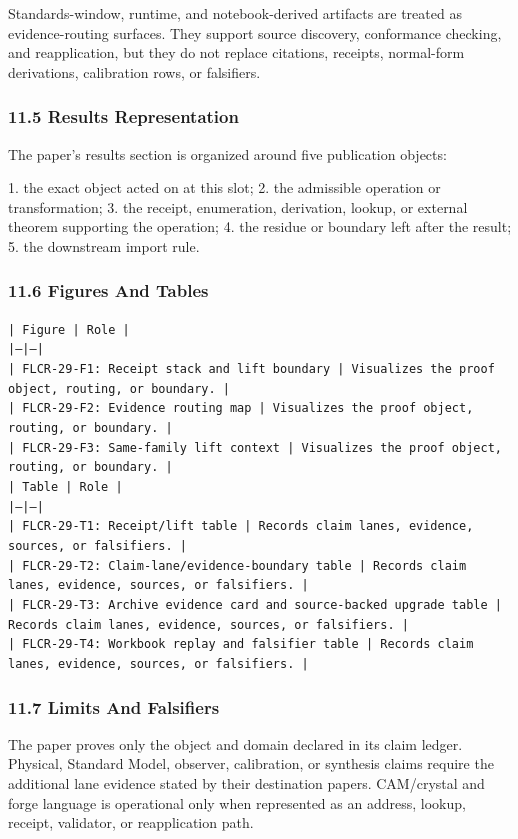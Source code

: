 \documentclass[11pt]{article}
\begin{document}
Standards-window, runtime, and notebook-derived artifacts are treated
as evidence-routing surfaces. They support source discovery, conformance
checking, and reapplication, but they do not replace citations, receipts,
normal-form derivations, calibration rows, or falsifiers.

\subsubsection*{11.5 Results Representation}

The paper's results section is organized around five publication objects:

1. the exact object acted on at this slot;
2. the admissible operation or transformation;
3. the receipt, enumeration, derivation, lookup, or external theorem supporting
   the operation;
4. the residue or boundary left after the result;
5. the downstream import rule.

\subsubsection*{11.6 Figures And Tables}

\noindent\texttt{| Figure | Role |}\\
\noindent\texttt{|---|---|}\\
\noindent\texttt{| FLCR-29-F1: Receipt stack and lift boundary | Visualizes the proof object, routing, or boundary. |}\\
\noindent\texttt{| FLCR-29-F2: Evidence routing map | Visualizes the proof object, routing, or boundary. |}\\
\noindent\texttt{| FLCR-29-F3: Same-family lift context | Visualizes the proof object, routing, or boundary. |}\\

\noindent\texttt{| Table | Role |}\\
\noindent\texttt{|---|---|}\\
\noindent\texttt{| FLCR-29-T1: Receipt/lift table | Records claim lanes, evidence, sources, or falsifiers. |}\\
\noindent\texttt{| FLCR-29-T2: Claim-lane/evidence-boundary table | Records claim lanes, evidence, sources, or falsifiers. |}\\
\noindent\texttt{| FLCR-29-T3: Archive evidence card and source-backed upgrade table | Records claim lanes, evidence, sources, or falsifiers. |}\\
\noindent\texttt{| FLCR-29-T4: Workbook replay and falsifier table | Records claim lanes, evidence, sources, or falsifiers. |}\\

\subsubsection*{11.7 Limits And Falsifiers}

The paper proves only the object and domain declared in its claim ledger.
Physical, Standard Model, observer, calibration, or synthesis claims require
the additional lane evidence stated by their destination papers. CAM/crystal
and forge language is operational only when represented as an address, lookup,
receipt, validator, or reapplication path.
\end{document}
